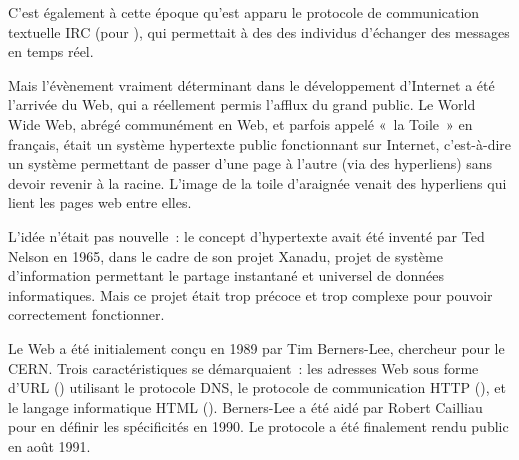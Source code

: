 C'est également à cette époque qu'est apparu le protocole de communication textuelle IRC (pour ), qui permettait à des des individus d'échanger des messages en temps réel.

Mais l'évènement vraiment déterminant dans le développement d'Internet a été l'arrivée du Web, qui a réellement permis l'afflux du grand public. Le World Wide Web, abrégé communément en Web, et parfois appelé «~la Toile~» en français, était un système hypertexte public fonctionnant sur Internet, c'est-à-dire un système permettant de passer d'une page à l'autre (via des hyperliens) sans devoir revenir à la racine. L'image de la toile d’araignée venait des hyperliens qui lient les pages web entre elles.

L'idée n'était pas nouvelle~: le concept d'hypertexte avait été inventé par Ted Nelson en 1965, dans le cadre de son projet Xanadu, projet de système d'information permettant le partage instantané et universel de données informatiques. Mais ce projet était trop précoce et trop complexe pour pouvoir correctement fonctionner. %

Le Web a été initialement conçu en 1989 par Tim Berners-Lee, chercheur pour le CERN. Trois caractéristiques se démarquaient~: les adresses Web sous forme d'URL () utilisant le protocole DNS, le protocole de communication HTTP (), et le langage informatique HTML (). Berners-Lee a été aidé par Robert Cailliau pour en définir les spécificités en 1990. Le protocole a été finalement rendu public en août 1991.

